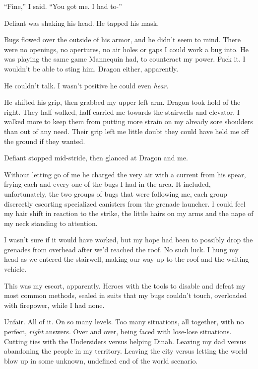 ``Fine,'' I said.  ``You got me.  I had to-''



Defiant was shaking his head.  He tapped his mask.



Bugs flowed over the outside of his armor, and he didn't seem to mind.  There were no openings, no apertures, no air holes or gaps I could work a bug into.  He was playing the same game Mannequin had, to counteract my power.  Fuck it.  I wouldn't be able to sting him.  Dragon either, apparently.



He couldn't talk.  I wasn't positive he could even \emph{hear}.



He shifted his grip, then grabbed my upper left arm.  Dragon took hold of the right.  They half-walked, half-carried me towards the stairwells and elevator.  I walked more to keep them from putting more strain on my already sore shoulders than out of any need.  Their grip left me little doubt they could have held me off the ground if they wanted.



Defiant stopped mid-stride, then glanced at Dragon and me.



Without letting go of me he charged the very air with a current from his spear, frying each and every one of the bugs I had in the area.  It included, unfortunately, the two groups of bugs that were following me, each group discreetly escorting specialized canisters from the grenade launcher.  I could feel my hair shift in reaction to the strike, the little hairs on my arms and the nape of my neck standing to attention.



I wasn't sure if it would have worked, but my hope had been to possibly drop the grenades from overhead after we'd reached the roof.  No such luck.  I hung my head as we entered the stairwell, making our way up to the roof and the waiting vehicle.



This was my escort, apparently.  Heroes with the tools to disable and defeat my most common methods, sealed in suits that my bugs couldn't touch, overloaded with firepower, while I had none.



Unfair.  All of it.  On so many levels.  Too many situations, all together, with no perfect, \emph{right} answers.  Over and over, being faced with lose-lose situations.  Cutting ties with the Undersiders versus helping Dinah.  Leaving my dad versus abandoning the people in my territory.  Leaving the city versus letting the world blow up in some unknown, undefined end of the world scenario.



